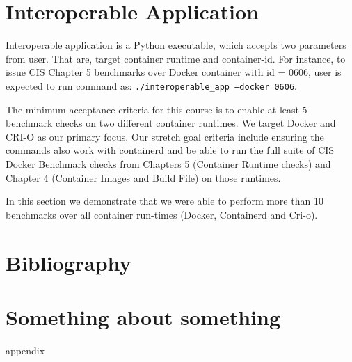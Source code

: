 \documentclass[times, twoside, watermark]{zHenriquesLab-StyleBioRxiv}
\begin{document}
\section*{Interoperable Application}

Interoperable application is a Python executable, which accepts two parameters from user. That are, target container runtime and container-id. For instance, to issue CIS Chapter 5 benchmarks over Docker container with id = 0606, user is expected to run command as:
\texttt{./interoperable\_app --docker 0606}.

The minimum acceptance criteria for this course is to enable at least 5 benchmark checks on two different container runtimes. We target Docker and CRI-O as our primary focus. Our stretch goal criteria include ensuring the commands also work with containerd and be able to run the full suite of CIS Docker Benchmark checks from Chapters 5 (Container Runtime checks) and Chapter 4 (Container Images and Build File) on those runtimes. 

In this section we demonstrate that we were able to perform more than 10 benchmarks over all container run-times (Docker, Containerd and Cri-o). 





\section*{Bibliography}

\onecolumn
\newpage

\captionsetup*{format=largeformat}
\section{Something about something} \label{note:Note1} 
appendix

\end{document}
